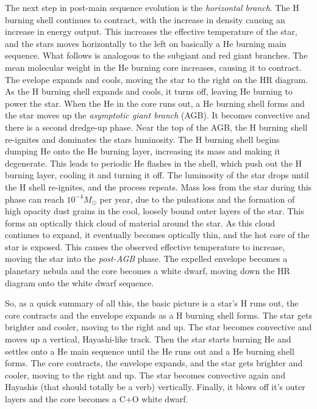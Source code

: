 The next step in post-main sequence evolution is the \emph{horizontal branch}.  The H burning 
shell continues to contract, with the increase in density causing an increase in energy output.  
This increases the effective temperature of the star, and the stars moves horizontally to the left 
on basically a He burning main sequence.  What follows is analogous to the subgiant and red giant 
branches.  The mean molecular weight in the He burning core increases, causing it to contract.  
The evelope expands and cools, moving the star to the right on the HR diagram.  As the 
H burning shell expands and cools, it turns off, leaving He burning to power the star.  
When the He in the core runs out, a He burning shell forms and the star moves up the 
\emph{asymptotic giant branch} (AGB).  It becomes convective and there is a second dredge-up 
phase.  Near the top of the AGB, the H burning shell re-ignites and dominates the stars 
luminosity.  The H burning shell begins dumping He onto the He burning layer, increasing its mass 
and making it degenerate.  This leads to periodic He flashes in the shell, which push out the 
H burning layer, cooling it and turning it off.  The luminosity of the star drops until the H 
shell re-ignites, and the process repeats.  Mass loss from the star during this phase can 
reach $10^{-4} M_{\odot}$ per year, due to the pulsations and the formation of high opacity dust 
grains in the cool, loosely bound outer layers of the star.  This forms an optically thick cloud 
of material around the star.  As this cloud continues to expand, it eventually becomes optically 
thin, and the hot core of the star is exposed.  This causes the observed effective temperature 
to increase, moving the star into the \emph{post-AGB} phase.  The expelled envelope becomes a 
planetary nebula and the core becomes a white dwarf, moving down the HR diagram onto the white 
dwarf sequence.  

So, as a quick summary of all this, the basic picture is a star's H runs out, the core 
contracts and the envelope expands as a H burning shell forms.  The star gets brighter and cooler, 
moving to the right and up.  The star becomes convective and moves up a vertical, Hayashi-like 
track.  Then the star starts burning He and settles onto a He main sequence until the He runs out 
and a He burning shell forms.  The core contracts, the envelope expands, and the star gets brighter 
and cooler, moving to the right and up.  The star becomes convective again and Hayashis (that 
should totally be a verb) vertically.  Finally, it blows off it's outer layers and the core 
becomes a C+O white dwarf.

